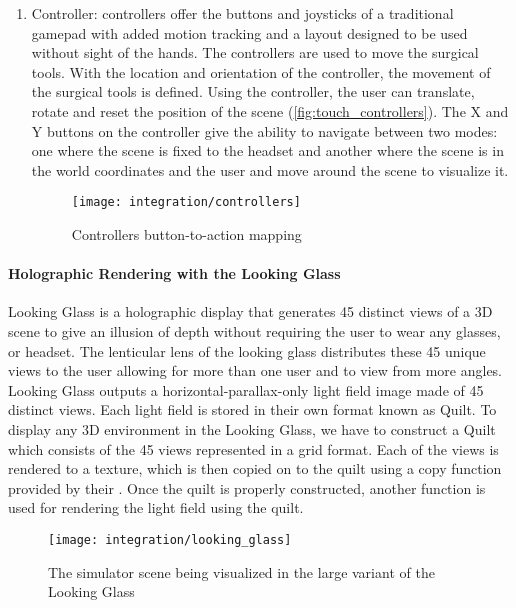 \begin{enumerate}
  \item Controller:
   controllers offer the buttons and joysticks of a traditional gamepad with added motion tracking and a layout designed to be used without sight of the hands. The controllers are used to move the surgical tools. With the location and orientation of the controller, the movement of the surgical tools is defined. Using the controller, the user can translate, rotate and reset the position of the scene (\autoref{fig:touch_controllers}). The \textsf{X} and \textsf{Y} buttons on the controller give the ability to navigate between two modes: one where the scene is fixed to the headset and another where the scene is in the world coordinates and the user and move around the scene to visualize it.

  \begin{figure}
    \centering
    \texttt{[image: integration/controllers]}
    \caption{Controllers button-to-action mapping}\label{fig:touch_controllers}
  \end{figure}
\end{enumerate}

\paragraph{Holographic Rendering with the Looking Glass}
Looking Glass is a holographic display that generates 45 distinct views of a 3D scene to give an illusion of depth without requiring the user to wear any glasses, or headset. The lenticular lens of the looking glass distributes these 45 unique views to the user allowing for more than one user and to view from more angles.
Looking Glass outputs a horizontal-parallax-only light field image made of 45 distinct views. Each light field is stored in their own format known as Quilt. To display any 3D environment in the Looking Glass, we have to construct a Quilt which consists of the 45 views represented in a grid format. Each of the views is rendered to a texture, which is then copied on to the quilt using a copy function provided by their . Once the quilt is properly constructed, another  function is used for rendering the light field using the quilt.

\begin{figure}
  \centering
  \texttt{[image: integration/looking\_glass]}
  \caption{The simulator scene being visualized in the large variant of the Looking Glass}\label{fig:looking_glass}
\end{figure}

